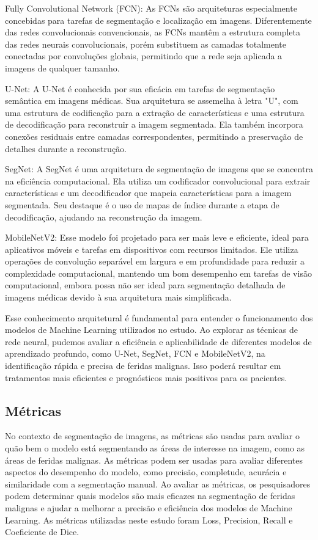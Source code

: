 Fully Convolutional Network (\ac{FCN}): As \ac{FCN}s são arquiteturas especialmente concebidas para tarefas de segmentação e localização em imagens. Diferentemente das redes convolucionais convencionais, as \ac{FCN}s mantêm a estrutura completa das redes neurais convolucionais, porém substituem as camadas totalmente conectadas por convoluções globais, permitindo que a rede seja aplicada a imagens de qualquer tamanho.

\ac{U-Net}: A \ac{U-Net} é conhecida por sua eficácia em tarefas de segmentação semântica em imagens médicas. Sua arquitetura se assemelha à letra "U", com uma estrutura de codificação para a extração de características e uma estrutura de decodificação para reconstruir a imagem segmentada. Ela também incorpora conexões residuais entre camadas correspondentes, permitindo a preservação de detalhes durante a reconstrução.

\ac{SegNet}: A \ac{SegNet} é uma arquitetura de segmentação de imagens que se concentra na eficiência computacional. Ela utiliza um codificador convolucional para extrair características e um decodificador que mapeia características para a imagem segmentada. Seu destaque é o uso de mapas de índice durante a etapa de decodificação, ajudando na reconstrução da imagem.

\ac{MobileNetV2}: Esse modelo foi projetado para ser mais leve e eficiente, ideal para aplicativos móveis e tarefas em dispositivos com recursos limitados. Ele utiliza operações de convolução separável em largura e em profundidade para reduzir a complexidade computacional, mantendo um bom desempenho em tarefas de visão computacional, embora possa não ser ideal para segmentação detalhada de imagens médicas devido à sua arquitetura mais simplificada.

Esse conhecimento arquitetural é fundamental para entender o funcionamento dos modelos de Machine Learning utilizados no estudo. Ao explorar as técnicas de rede neural, pudemos avaliar a eficiência e aplicabilidade de diferentes modelos de aprendizado profundo, como \ac{U-Net}, \ac{SegNet}, \ac{FCN} e \ac{MobileNetV2}, na identificação rápida e precisa de feridas malignas. Isso poderá resultar em tratamentos mais eficientes e prognósticos mais positivos para os pacientes.

\subsection{Métricas}

No contexto de segmentação de imagens, as métricas são usadas para avaliar o quão bem o modelo está segmentando as áreas de interesse na imagem, como as áreas de feridas malignas. As métricas podem ser usadas para avaliar diferentes aspectos do desempenho do modelo, como precisão, completude, acurácia e similaridade com a segmentação manual. Ao avaliar as métricas, os pesquisadores podem determinar quais modelos são mais eficazes na segmentação de feridas malignas e ajudar a melhorar a precisão e eficiência dos modelos de Machine Learning. As métricas utilizadas neste estudo foram Loss, Precision, Recall e Coeficiente de Dice. 

